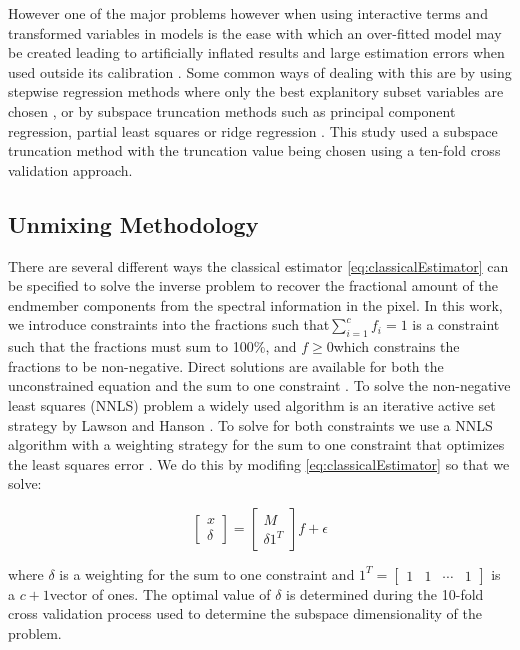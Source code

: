 \documentclass[remotesensing,article,accept,moreauthors,pdftex,12pt,a4paper]{mdpi}
\begin{document}
However one of the major problems however when using interactive terms and transformed variables in models is the ease with which an over-fitted model may be created leading to artificially inflated results and large estimation errors when used outside its calibration \citep{Salvador1998}. Some common ways of dealing with this are by using stepwise regression methods where only the best explanitory subset variables are chosen \citep{Grossman1996}, or by subspace truncation methods such as principal component regression, partial least squares or ridge regression \citep{Kalivas1999}. This study used a subspace truncation method with the truncation value being chosen using a ten-fold cross validation approach. 

\subsection{Unmixing Methodology}

There are several different ways the classical estimator \ref{eq:classicalEstimator} can be specified to solve the inverse problem to recover the fractional amount of the endmember components from the spectral information in the pixel\citep{Keshava2002}. In this work, we introduce constraints into the fractions such that$\sum_{i=1}^{c}f_{i}=1$ is a constraint such that the fractions must sum to 100\%, and $f\geq0$which constrains the fractions to be non-negative. Direct solutions are available for both the unconstrained equation and the sum to one constraint \citep{Lawson1995}. To solve the non-negative least squares (NNLS) problem a widely used algorithm is an iterative active set strategy by Lawson and Hanson \citep{Lawson1995}. To solve for both constraints we use a NNLS algorithm with a weighting strategy for the sum to one constraint that optimizes the least squares error \citep{Heinz2001}. We do this by modifing \ref{eq:classicalEstimator} so that we solve:

\begin{equation} \left[\begin{array}{c} x\\ \delta\end{array}\right]=\left[\begin{array}{c} M\\ \delta1^{T}\end{array}\right]f+\epsilon\label{eq:classicalConstrained}\end{equation} 

where $\delta$ is a weighting for the sum to one constraint and $1^{T}=\left[\begin{array}{cccc} 1 & 1 & \cdots & 1\end{array}\right]$ is a $c+1$vector of ones. The optimal value of $\delta$ is determined during the 10-fold cross validation process used to determine the subspace dimensionality of the problem. 
\end{document}
